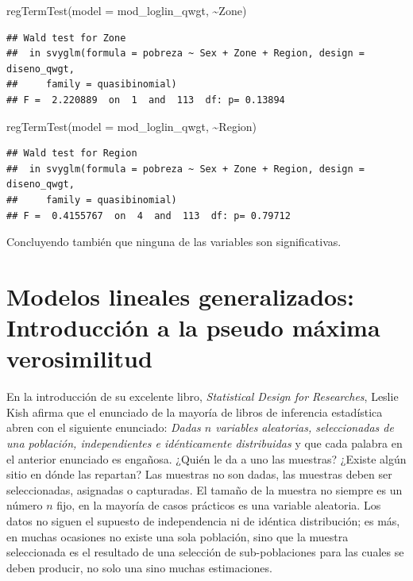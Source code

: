 \documentclass[
  12pt,
]{book}
\newenvironment{Shaded}{\begin{snugshade}}{\end{snugshade}}
\newcommand{\AttributeTok}[1]{\textcolor[rgb]{0.77,0.63,0.00}{#1}}
\newcommand{\FunctionTok}[1]{\textcolor[rgb]{0.00,0.00,0.00}{#1}}
\newcommand{\NormalTok}[1]{#1}
\newcommand{\SpecialCharTok}[1]{\textcolor[rgb]{0.00,0.00,0.00}{#1}}
\begin{document}
\begin{Shaded}
\begin{Highlighting}[]
\FunctionTok{regTermTest}\NormalTok{(}\AttributeTok{model =}\NormalTok{ mod\_loglin\_qwgt, }\SpecialCharTok{\textasciitilde{}}\NormalTok{Zone)}
\end{Highlighting}
\end{Shaded}

\begin{verbatim}
## Wald test for Zone
##  in svyglm(formula = pobreza ~ Sex + Zone + Region, design = diseno_qwgt, 
##     family = quasibinomial)
## F =  2.220889  on  1  and  113  df: p= 0.13894
\end{verbatim}

\begin{Shaded}
\begin{Highlighting}[]
\FunctionTok{regTermTest}\NormalTok{(}\AttributeTok{model =}\NormalTok{ mod\_loglin\_qwgt, }\SpecialCharTok{\textasciitilde{}}\NormalTok{Region)}
\end{Highlighting}
\end{Shaded}

\begin{verbatim}
## Wald test for Region
##  in svyglm(formula = pobreza ~ Sex + Zone + Region, design = diseno_qwgt, 
##     family = quasibinomial)
## F =  0.4155767  on  4  and  113  df: p= 0.79712
\end{verbatim}

Concluyendo también que ninguna de las variables son significativas.

\hypertarget{modelos-lineales-generalizados-introducciuxf3n-a-la-pseudo-muxe1xima-verosimilitud}{%
\chapter{Modelos lineales generalizados: Introducción a la pseudo máxima verosimilitud}\label{modelos-lineales-generalizados-introducciuxf3n-a-la-pseudo-muxe1xima-verosimilitud}}

En la introducción de su excelente libro, \emph{Statistical Design for Researches}, Leslie Kish afirma que el enunciado de la mayoría de libros de inferencia estadística abren con el siguiente enunciado: \emph{Dadas \(n\) variables aleatorias, seleccionadas de una población, independientes e idénticamente distribuidas} y que cada palabra en el anterior enunciado es engañosa. ¿Quién le da a uno las muestras? ¿Existe algún sitio en dónde las repartan? Las muestras no son dadas, las muestras deben ser seleccionadas, asignadas o capturadas. El tamaño de la muestra no siempre es un número \(n\) fijo, en la mayoría de casos prácticos es una variable aleatoria. Los datos no siguen el supuesto de independencia ni de idéntica distribución; es más, en muchas ocasiones no existe una sola población, sino que la muestra seleccionada es el resultado de una selección de sub-poblaciones para las cuales se deben producir, no solo una sino muchas estimaciones.
\end{document}

